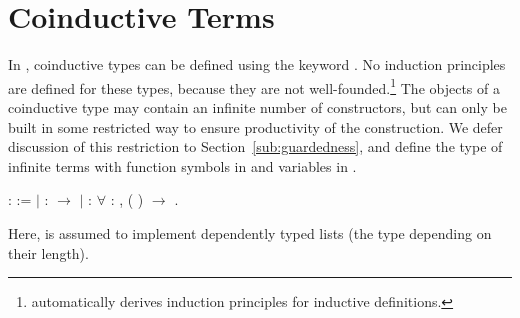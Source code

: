 \section{Coinductive Terms}

In \Coq, coinductive types can be defined using the
 keyword \citep{gimenez-casteran-07}. No
induction principles are defined for these types, because they are not
well-founded.\footnote{\Coq automatically derives induction principles
  for inductive definitions.}
The objects of a coinductive type may contain an infinite number of
constructors, but can only be built in some restricted way to ensure
productivity of the construction.
We defer discussion of this restriction to
Section~\ref{sub:guardedness}, and define the type
 of infinite terms with
function symbols in  and variables in .
\begin{singlespace}
\begin{coqdoccode}
\coqdocnoindent
{}  :
 :=\coqdoceol
\coqdocindent{1.00em}
\ensuremath{|}  : 
\ensuremath{\rightarrow} \coqdoceol
\coqdocindent{1.00em}
\ensuremath{|}  :
\ensuremath{\forall}  : ,
( )
\ensuremath{\rightarrow} .\coqdoceol
\end{coqdoccode}
\end{singlespace}
Here,  is assumed to
implement dependently typed lists (the type depending on their length).

